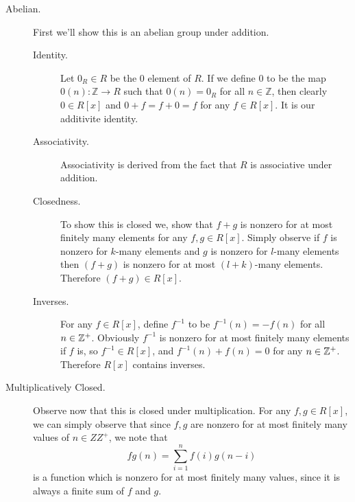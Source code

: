     \begin{description}
        \item[Abelian.] First we'll show this is an abelian group
        under addition.
        \begin{description}
            \item[Identity.]Let $0_R \in R$ be the 0 element of $R$.
            If we define 0 to be
            the map $0(n) : \mathbb{Z} \to R$ such that $0(n) = 0_R$
            for all $n \in \mathbb{Z}$, then clearly $0 \in R[x]$ and
            $0 + f = f + 0 = f$ for any $f \in R[x]$. It is our
            additivite identity. 

            \item[Associativity.] Associativity is derived from
            the fact that $R$ is associative under addition.

            \item[Closedness.] 
            To show this is closed we, show that $f + g$ is nonzero
            for at most finitely many elements for any $f, g \in
            R[x]$. Simply observe if $f$ is nonzero for $k$-many
            elements and $g$ is nonzero 
            for $l$-many elements then $(f + g)$ is nonzero for at
            most $(l + k)$-many elements. Therefore $(f + g) \in R[x]$.

            \item[Inverses.] 
            For any $f \in R[x]$, define $f^{-1}$ to be $f^{-1}(n)
            = -f(n)$ for all $n \in \mathbb{Z}^{+}$. Obviously $f^{-1}$
            is nonzero for at most finitely many elements if $f$
            is, so $f^{-1} \in R[x]$, and $f^{-1}(n) + f(n) = 0$
            for any $n \in \mathbb{Z}^{+}$. Therefore $R[x]$ contains inverses.  
        \end{description} 

        \item[Multiplicatively Closed.]
        Observe now that this is closed under multiplication. For
        any $f, g \in R[x]$, we can simply observe that since $f,
        g$ are nonzero for at most finitely many values of $n \in
        ZZ^{+}$, we note that 
        \[
            fg(n) = \sum_{i = 1}^{n}f(i)g(n - i)
        \]
        is a function which is nonzero for at most finitely many
        values, since it is always a finite sum of $f$ and $g$.


\end{description}
